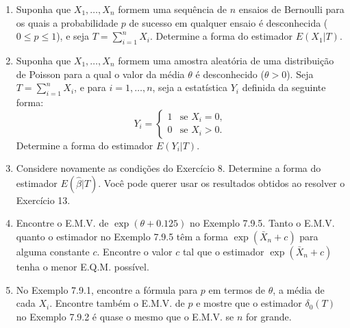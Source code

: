 \begin{enumerate}
        \item Suponha que $X_1, \dots, X_n$ formem uma sequência de $n$ ensaios de Bernoulli para os quais a probabilidade $p$ de sucesso em qualquer ensaio é desconhecida ($0 \le p \le 1$), e seja $T = \sum_{i=1}^{n} X_i$. Determine a forma do estimador $E(X_1|T)$.

    \item Suponha que $X_1, \dots, X_n$ formem uma amostra aleatória de uma distribuição de Poisson para a qual o valor da média $\theta$ é desconhecido ($\theta > 0$). Seja $T = \sum_{i=1}^{n} X_i$, e para $i=1, \dots, n$, seja a estatística $Y_i$ definida da seguinte forma:
    \[ Y_i = 
    \begin{cases} 
    1 & \text{se } X_i = 0, \\ 
    0 & \text{se } X_i > 0. 
    \end{cases} \]
    Determine a forma do estimador $E(Y_i|T)$.

    \item Considere novamente as condições do Exercício 8. Determine a forma do estimador $E(\hat{\beta}|T)$. Você pode querer usar os resultados obtidos ao resolver o Exercício 13.

    \item Encontre o E.M.V. de $\exp(\theta + 0.125)$ no Exemplo 7.9.5. Tanto o E.M.V. quanto o estimador no Exemplo 7.9.5 têm a forma $\exp(\bar{X}_n + c)$ para alguma constante $c$. Encontre o valor $c$ tal que o estimador $\exp(\bar{X}_n + c)$ tenha o menor E.Q.M. possível.

    \item No Exemplo 7.9.1, encontre a fórmula para $p$ em termos de $\theta$, a média de cada $X_i$. Encontre também o E.M.V. de $p$ e mostre que o estimador $\delta_0(T)$ no Exemplo 7.9.2 é quase o mesmo que o E.M.V. se $n$ for grande.

\end{enumerate}